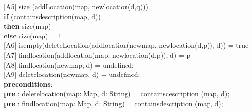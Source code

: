 \documentclass[12pt]{article}
\begin{document}
\begin{spacing}{1.5}
\hspace*{5mm} [A5] size (addLocation(map, newlocation(d,q))) = \\ \hspace*{15mm} \textbf{if} (containsdescription(map, d)) \\ \hspace*{25mm}\textbf{then} size(map) \\ \hspace*{15mm} \textbf{else} size(map) + 1\\
\hspace*{5mm} [A6] isempty(deleteLocation(addlocation(newmap, newlocation(d,p)), d)) = true \\
\hspace*{5mm} [A7] findlocation(addlocation(map, newlocation(d,p)), d) = p\\
\hspace*{5mm} [A8] findlocation(newmap, d) = undefined;\\
\hspace*{5mm} [A9] deletelocation(newmap, d) = undefined;\\
\hspace*{5mm} \textbf{preconditions}:\\
\hspace*{10mm} \textbf{pre} : deletelocation(map: Map, d: String) = containsdescription (map, d);\\
\hspace*{10mm} \textbf{pre} : findlocation(map: Map, d: String) = containsdescription (map, d);\\
\end{spacing}
\end{document}
